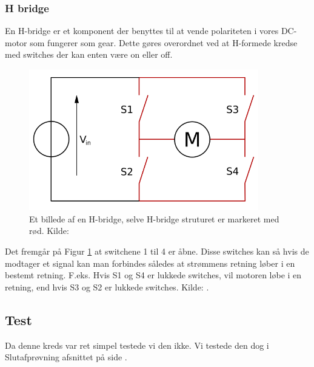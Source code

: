 \subsubsection{H bridge}\label{subs:hbridgeTeori}
En H-bridge er et komponent der benyttes til at vende polariteten i vores DC-motor som fungerer som gear. Dette gøres overordnet ved at H-formede kredse med switches der kan enten være on eller off. 
\begin{figure}[H]
	\centering
    \includegraphics[width=10cm]{figures/2_4_3hastighed/hbridge.png}
	\caption{Et billede af en H-bridge, selve H-bridge struturet er markeret med rød. Kilde: \cite{teorihbridge}}
	\label{fig:hbridge}
\end{figure}
Det fremgår på Figur \ref{fig:hbridge} at switchene 1 til 4 er åbne. Disse switches kan så hvis de modtager et signal kan man forbindes således at strømmens retning løber i en bestemt retning. F.eks. Hvis S1 og S4 er lukkede switches, vil motoren løbe i en retning, end hvis S3 og S2 er lukkede switches. Kilde: \cite{teorihbridge}. 




\subsection{Test}

Da denne kreds var ret simpel testede vi den ikke. Vi testede den dog i Slutafprøvning afsnittet på side \pageref{sluttest}.